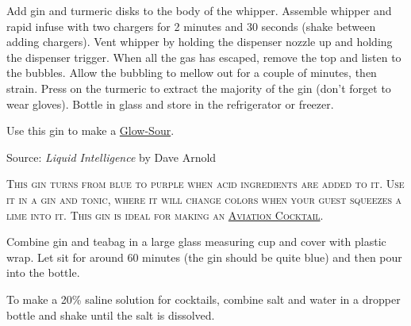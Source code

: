 \documentclass[letterpaper]{recipePMG}
\begin{document}
Add gin and turmeric disks to the body of the whipper. Assemble whipper and rapid infuse with two chargers for 2 minutes and 30 seconds (shake between adding chargers). Vent whipper by holding the dispenser nozzle up and holding the dispenser trigger.  When all the gas has escaped, remove the top and listen to the bubbles.  Allow the bubbling to mellow out for a couple of minutes, then strain.  Press on the turmeric to extract the majority of the gin (don't forget to wear gloves). Bottle in glass and store in the refrigerator or freezer.

Use this gin to make a \hyperref[GlowSour]{Glow-Sour}.

Source: \textit{Liquid Intelligence} by Dave Arnold

\label{CeruleanGin}

\textsc{This gin turns from blue to purple when acid ingredients are added to it. Use it in a gin and tonic, where it will change colors when your guest squeezes a lime into it. This gin is ideal for making an \hyperref[Aviation]{Aviation Cocktail}.}


Combine gin and teabag in a large glass measuring cup and cover with plastic wrap.  Let sit for around 60 minutes (the gin should be quite blue) and then pour into the bottle. 

\label{CocktailSaline}


To make a 20\% saline solution for cocktails, combine salt and water in a dropper bottle and shake until the salt is dissolved. 
\end{document}
